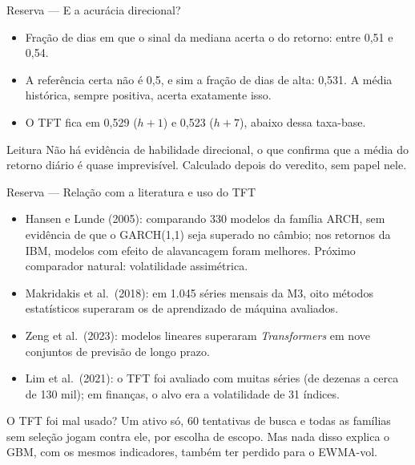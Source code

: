 \documentclass[aspectratio=169,10pt]{beamer}
\newcommand{\hum}{\(h{+}1\)}
\newcommand{\hsete}{\(h{+}7\)}
\begin{document}
\begin{frame}{Reserva --- E a acurácia direcional?}
  \begin{itemize}
    \item Fração de dias em que o sinal da mediana acerta o do retorno: entre 0,51 e 0,54.
    \item A referência certa não é 0,5, e sim a fração de dias de alta: 0,531. A média
      histórica, sempre positiva, acerta exatamente isso.
    \item O TFT fica em 0,529 (\hum) e 0,523 (\hsete), abaixo dessa taxa-base.
  \end{itemize}
  \vspace{4pt}
  \begin{block}{Leitura}
    Não há evidência de habilidade direcional, o que confirma que a média do retorno
    diário é quase imprevisível. Calculado depois do veredito, sem papel nele.
  \end{block}
\end{frame}

\begin{frame}{Reserva --- Relação com a literatura e uso do TFT}
  \small
  \begin{itemize}
    \item Hansen e Lunde (2005): comparando 330 modelos da família ARCH, sem evidência
      de que o GARCH(1,1) seja superado no câmbio; nos retornos da IBM, modelos com efeito
      de alavancagem foram melhores. Próximo comparador natural: volatilidade assimétrica.
    \item Makridakis et al.\ (2018): em 1.045 séries mensais da M3, oito métodos
      estatísticos superaram os de aprendizado de máquina avaliados.
    \item Zeng et al.\ (2023): modelos lineares superaram \textit{Transformers} em nove
      conjuntos de previsão de longo prazo.
    \item Lim et al.\ (2021): o TFT foi avaliado com muitas séries (de dezenas a cerca
      de 130 mil); em finanças, o alvo era a volatilidade de 31 índices.
  \end{itemize}
  \begin{block}{O TFT foi mal usado?}
    Um ativo só, 60 tentativas de busca e todas as famílias sem seleção jogam contra ele,
    por escolha de escopo. Mas nada disso explica o GBM, com os mesmos indicadores,
    também ter perdido para o EWMA-vol.
  \end{block}
\end{frame}
\end{document}
